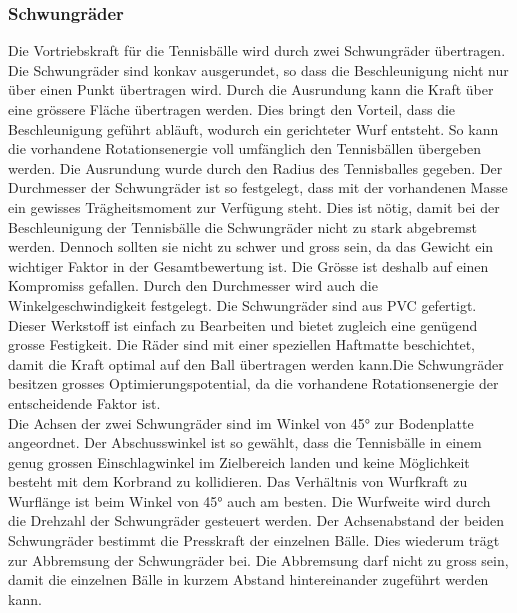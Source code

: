 ﻿\subsubsection{Schwungräder}
Die Vortriebskraft für die Tennisbälle wird durch zwei Schwungräder übertragen. Die Schwungräder sind konkav ausgerundet, so dass die Beschleunigung nicht nur über einen Punkt übertragen wird. Durch die Ausrundung kann die Kraft über eine grössere Fläche übertragen werden. Dies bringt den Vorteil, dass die Beschleunigung geführt abläuft, wodurch ein gerichteter Wurf entsteht. So kann die vorhandene Rotationsenergie voll umfänglich den Tennisbällen übergeben werden. Die Ausrundung wurde durch den Radius des Tennisballes gegeben. Der Durchmesser der Schwungräder ist so festgelegt, dass mit der vorhandenen Masse ein gewisses Trägheitsmoment zur Verfügung steht. Dies ist nötig, damit bei der Beschleunigung der Tennisbälle die Schwungräder nicht zu stark abgebremst werden. Dennoch sollten sie nicht zu schwer und gross sein, da das Gewicht ein wichtiger Faktor in der Gesamtbewertung ist. Die Grösse ist deshalb auf einen Kompromiss gefallen. Durch den Durchmesser wird auch die Winkelgeschwindigkeit festgelegt. Die Schwungräder sind aus PVC gefertigt. Dieser Werkstoff ist einfach zu Bearbeiten und bietet zugleich eine genügend grosse Festigkeit. Die Räder sind mit einer speziellen Haftmatte beschichtet, damit die Kraft optimal auf den Ball übertragen werden kann.Die Schwungräder besitzen grosses Optimierungspotential, da die vorhandene Rotationsenergie der entscheidende Faktor ist.\\
Die Achsen der zwei Schwungräder sind im Winkel von 45° zur Bodenplatte angeordnet. Der Abschusswinkel ist so gewählt, dass die Tennisbälle in einem genug grossen Einschlagwinkel im Zielbereich landen und keine Möglichkeit besteht mit dem Korbrand zu kollidieren. Das Verhältnis von Wurfkraft zu Wurflänge ist beim Winkel von 45° auch am besten. Die Wurfweite wird durch die Drehzahl der Schwungräder gesteuert werden. Der Achsenabstand der beiden Schwungräder bestimmt die Presskraft der einzelnen Bälle. Dies wiederum trägt zur Abbremsung der Schwungräder bei. Die Abbremsung darf nicht zu gross sein, damit die einzelnen Bälle in kurzem Abstand hintereinander zugeführt werden kann. 

